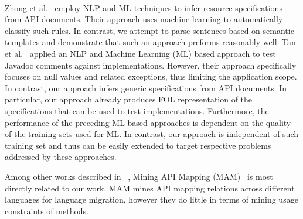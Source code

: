 \
~\cite{pandita12:inferring}
~\cite{pandita13:WHYPER}


Zhong et al.~\cite{zhong09SE} employ NLP and ML techniques to infer resource specifications from API documents. Their approach uses machine learning to automatically classify such rules. In contrast, we attempt to parse sentences based on semantic templates and demonstrate that such an approach preforms reasonably well. Tan et al.~\cite{TanSOSP07} applied an NLP and Machine Learning (ML) based approach to test Javadoc comments against implementations. However, their approach specifically focuses on null values and related exceptions, thus limiting the application scope. In contrast, our approach infers generic specifications from API documents. In particular, our approach already produces FOL representation of the specifications that can be used to test implementations. Furthermore, the performance of the preceding ML-based approaches is dependent on the quality of the training sets used for ML. In contrast, our approach is independent of such training set and thus can be easily extended to target respective problems addressed by these approaches.



Among other works described in ~\cite{RobillardIEEEtranSE13}, Mining API Mapping (MAM)~\cite{Zhong2010ICSE} is most directly related to our work. MAM mines API mapping relations across different languages for language migration, however they do little in terms of mining usage constraints of methods.




